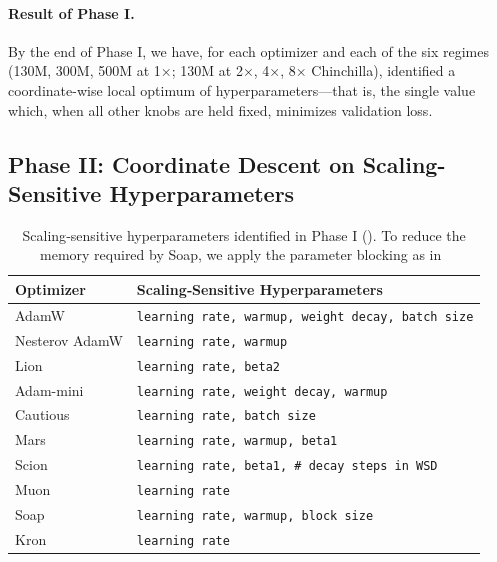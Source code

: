 \paragraph{Result of Phase I.} By the end of Phase I, we have, for each optimizer and each of the six regimes (130M, 300M, 500M at 1×; 130M at 2×, 4×, 8× Chinchilla), identified a coordinate-wise local optimum of hyperparameters—that is, the single value which, when all other knobs are held fixed, minimizes validation loss. 

\subsection{Phase II: Coordinate Descent on Scaling-Sensitive Hyperparameters}
\label{sec:phase2}

\begin{table}[t]
  \centering
  \begin{tabular}{ll}
    \toprule
    \textbf{Optimizer} & \textbf{Scaling‐Sensitive Hyperparameters} \\
    \midrule
    AdamW             & \texttt{learning rate, warmup, weight decay, batch size} \\
    Nesterov AdamW    & \texttt{learning rate, warmup} \\
    Lion               & \texttt{learning rate, beta2} \\
    Adam-mini          & \texttt{learning rate, weight decay, warmup} \\
    Cautious           & \texttt{learning rate, batch size} \\
    Mars               & \texttt{learning rate, warmup, beta1} \\
    Scion              & \texttt{learning rate, beta1, \# decay steps in WSD \cite{hu2024minicpmunveilingpotentialsmall}} \\
    Muon               & \texttt{learning rate} \\
    Soap            & \texttt{learning rate, warmup, block size} \\
    Kron               & \texttt{learning rate} \\
    \bottomrule
  \end{tabular}
  \caption{Scaling‐sensitive hyperparameters identified in Phase I (). To reduce the memory required by Soap, we apply the parameter blocking as in~\cite{anil2021scalablesecondorderoptimization}} 
  \label{tab:sensitive-hyper}
\end{table}

